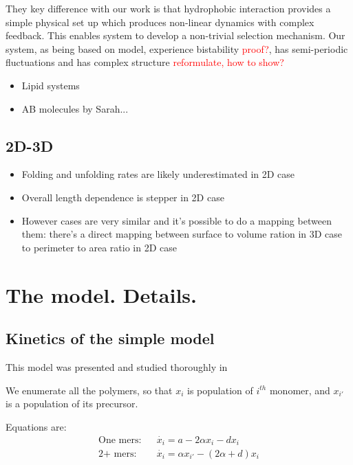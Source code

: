 \documentclass[twoside,twocolumn,9pt]{article}
\newcommand{\ga}{\alpha}
\newcommand{\red}[1]{\textcolor{red}{#1}}
\begin{document}
They key difference with our work is 
that hydrophobic interaction provides a simple physical set up which produces non-linear dynamics with complex feedback.
This enables system to develop a non-trivial selection mechanism. Our system, as being based on 
\cite{Ohtsuki2009} model, experience bistability \red{proof?}, has semi-periodic fluctuations  and 
has complex structure \red{reformulate, how to show?}
\begin{itemize}
 \item Lipid systems
 \item AB molecules by Sarah...
\end{itemize}



\subsection{2D-3D}
\begin{itemize}
 \item Folding and unfolding rates are likely underestimated in 2D case
 \item Overall length dependence is stepper in 2D case
 \item However cases are very similar and it's possible to do a mapping between them: there's a 
direct mapping between surface to volume ration in 3D case to perimeter to area ratio in 2D case
\end{itemize}


 \newpage
\appendix


\section{The model. Details.}
\subsection{Kinetics of the simple model}
This model was presented and studied thoroughly in 
\cite{nowak2008prevolutionary,Ohtsuki2009,Chen2012}

We enumerate all the polymers, so that $x_i$ is population of $i^{th}$ monomer, and $x_{i'}$ is a 
population of its precursor.

Equations are:
  \begin{eqnarray}
   \mbox{One mers:}&& \dot{x_i}=a-2\ga x_i-dx_i \\
     \mbox{2+ mers:}&& \dot{x_i}=\ga x_{i'}-(2\ga+d)x_i
  \end{eqnarray}
\end{document}
